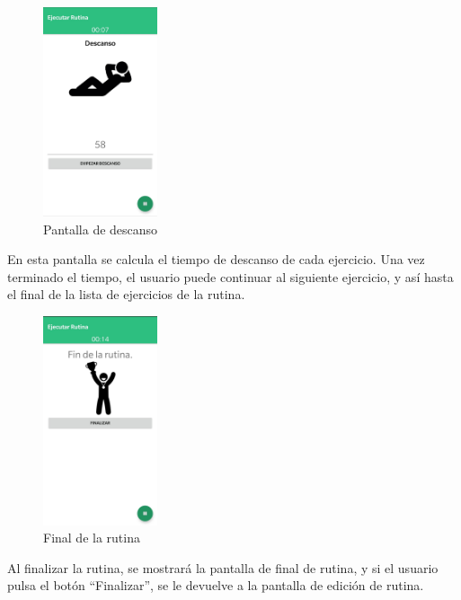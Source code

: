 \documentclass[11pt,a4paper]{report}
\begin{document}
\begin{figure}[H]
	\centering
	\includegraphics[width=0.3\textwidth]{graficos/manual/PantallaDescanso.jpg}
	\caption{Pantalla de descanso}
\end{figure}
En esta pantalla se calcula el tiempo de descanso de cada ejercicio. Una vez terminado el tiempo, el usuario puede continuar al siguiente ejercicio, y así hasta el final de la lista de ejercicios de la rutina.

\begin{figure}[H]
	\centering
	\includegraphics[width=0.3\textwidth]{graficos/manual/FinRutina.jpg}
	\caption{Final de la rutina}
\end{figure}
Al finalizar la rutina, se mostrará la pantalla de final de rutina, y si el usuario pulsa el botón “Finalizar”, se le devuelve a la pantalla de edición de rutina.
\end{document}
